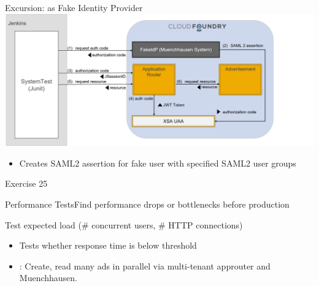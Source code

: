 \begin{frame}{Excursion:  as Fake Identity Provider} 
\includegraphics[height=0.65\textheight]{../TestStrategy/images/SystemTest_detailed}
\small
\\
\begin{itemize}
    \item Creates SAML2 assertion for fake user with specified SAML2 user groups
\end{itemize}
\end{frame}

\begin{frame}{Exercise 25}
	\begin{figure}
	\end{figure}
	\vfill
\end{frame}

\begin{frame}[fragile]{Performance Tests}{Find performance drops or bottlenecks before production}
	\begin{figure}
	\end{figure}
	\vfill
	\begin{block}{Test expected load (\# concurrent users, \# HTTP connections)}
	\vspace{-2mm}
	\begin{itemize}
		\item Tests whether response time is below threshold 
		\item {}: Create, read many ads in parallel via multi-tenant approuter and Muenchhausen. 
	\end{itemize}
	\end{block}
\end{frame}

